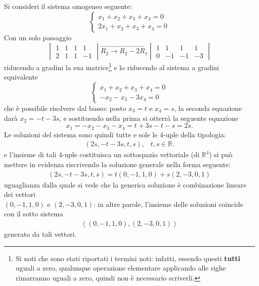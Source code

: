 \begin{es}
  \label{es:gauss-jordan4}
  Si consideri il sistema omogeneo seguente:
  \begin{equation}
    \label{eq:gauss-jordan4-1}
    \begin{cases}
      x_1+x_2+x_3+x_4=0\\
      2x_1+x_2+x_3+x_4=0
    \end{cases}
  \end{equation}
  Con un solo passaggio
  \begin{equation*}
    \begin{vmatrix}
      1 & 1 & 1 & 1\\
      2 & 1 & 1 & -1
    \end{vmatrix}\overrightarrow{R_2\to R_2-2R_1}
    \begin{vmatrix}
      1 & 1 & 1 & 1\\
      0 & -1 & -1 & -3
    \end{vmatrix}
  \end{equation*}
  riducendo a gradini la sua matrice\footnote{Si noti che sono stati riportati
    i termini noti: infatti, essendo questi \textbf{tutti} uguali a zero,
    qualunque operazione elementare applicando alle righe rimarranno uguali a
    zero, quindi non è necessario scriverli.} e lo riducendo al sistema a gradini
  equivalente
  \begin{equation*}
    \begin{cases}
      x_1+x_2+x_3+x_4=0\\
      -x_2-x_3-3x_4=0
    \end{cases}
  \end{equation*}
  che è possibile risolvere dal basso: posto $x_3=t$ e $x_4=s$, la seconda
  equazione darà $x_2=-t-3s$, e sostituendo nella prima si otterrà la seguente
  equazione
  \begin{equation*}
    x_1=-x_2-x_3-x_4=t+3s-t-s=2s.
  \end{equation*}
  Le soluzioni del sistema sono quindi tutte e sole le 4-uple della tipologia:
  \begin{eqnarray*}
    (2s,-t-3s,t,s), & t,s\in \mathds{R}.
  \end{eqnarray*}
  e l'insieme di tali 4-uple costituisca un sottospazio vettoriale (di $\mathds{R}^4$)
  si può mettere in evidenza riscrivendo la soluzione generale nella forma seguente:
  \begin{eqnarray*}
    (2s,-t-3s,t,s)=t(0,-1,1,0)+s(2,-3,0,1)
  \end{eqnarray*}
  uguaglianza dalla quale si vede che la generica soluzione è combinazione lineare
  dei vettori\\ $(0,-1,1,0)$ e $(2,-3,0,1)$: in altre parole, l'insieme delle soluzioni
  coincide con il sotto sistema
  \begin{eqnarray*}
    \left<(0,-1,1,0),(2,-3,0,1)\right>
  \end{eqnarray*}
  generato da tali vettori.
\end{es}
